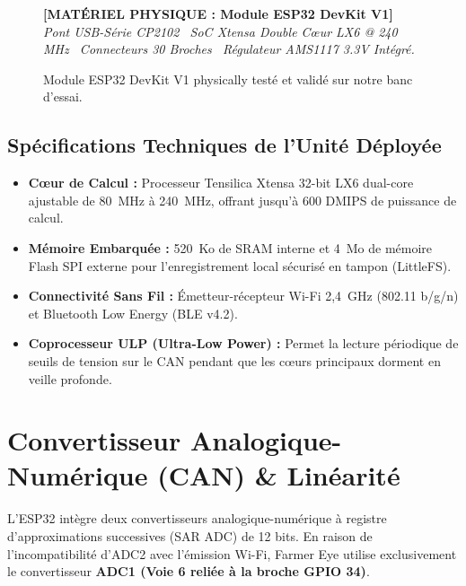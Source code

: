 \documentclass[11pt,a4paper,oneside]{report}
\begin{document}
\begin{figure}[h!]
\centering
\begin{tcolorbox}[enhanced,colback=white,colframe=nasablue,width=0.7\linewidth,arc=2mm]
\centering
\textbf{[MATÉRIEL PHYSIQUE : Module ESP32 DevKit V1]}\\[0.2cm]
\textit{Pont USB-Série CP2102 \textbar\ SoC Xtensa Double Cœur LX6 @ 240 MHz \textbar\ Connecteurs 30 Broches \textbar\ Régulateur AMS1117 3.3V Intégré.}
\end{tcolorbox}
\caption{Module ESP32 DevKit V1 physically testé et validé sur notre banc d'essai.}
\label{fig:materiel_esp32}
\end{figure}

\subsection{Spécifications Techniques de l'Unité Déployée}
\begin{itemize}[leftmargin=*]
    \item \textbf{Cœur de Calcul :} Processeur Tensilica Xtensa 32-bit LX6 dual-core ajustable de 80~MHz à 240~MHz, offrant jusqu'à 600 DMIPS de puissance de calcul.
    \item \textbf{Mémoire Embarquée :} 520~Ko de SRAM interne et 4~Mo de mémoire Flash SPI externe pour l'enregistrement local sécurisé en tampon (LittleFS).
    \item \textbf{Connectivité Sans Fil :} Émetteur-récepteur Wi-Fi 2,4~GHz (802.11 b/g/n) et Bluetooth Low Energy (BLE v4.2).
    \item \textbf{Coprocesseur ULP (Ultra-Low Power) :} Permet la lecture périodique de seuils de tension sur le CAN pendant que les cœurs principaux dorment en veille profonde.
\end{itemize}

\section{Convertisseur Analogique-Numérique (CAN) & Linéarité}
L'ESP32 intègre deux convertisseurs analogique-numérique à registre d'approximations successives (SAR ADC) de 12 bits. En raison de l'incompatibilité d'ADC2 avec l'émission Wi-Fi, Farmer Eye utilise exclusivement le convertisseur \textbf{ADC1 (Voie 6 reliée à la broche GPIO 34)}.
\end{document}
